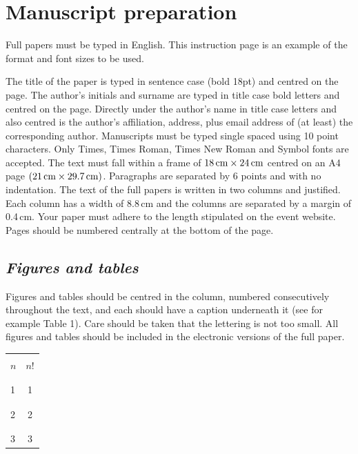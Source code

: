 \documentclass[12pt]{IET02}
\begin{document}

\section{Manuscript preparation}

Full papers must be typed in English. This instruction page is an
example of the format and font sizes to be used.

The title of the paper is typed in sentence case (bold 18pt) and
centred on the page. The author's initials and surname are typed
in title case bold letters and centred on the page. Directly under
the author's name in title case letters and also centred is the
author's affiliation, address, plus email address of (at least)
the corresponding author. Manuscripts must be typed single spaced
using 10 point characters. Only Times, Times Roman, Times New
Roman and Symbol fonts are accepted. The text must fall within a
frame of $18\,\hbox{cm} \times 24\,\hbox{cm}$ centred on an A4
page $(21\,\hbox{cm} \times 29.7\,\hbox{cm})$. Paragraphs are
separated by 6 points and with no indentation. The text of the
full papers is written in two columns and justified. Each column
has a width of 8.8\,cm and the columns are separated by a margin
of 0.4\,cm. Your paper must adhere to the length stipulated on the
event website. Pages should be numbered centrally at the bottom of
the page.

\subsection{\it Figures and tables}

Figures and tables should be centred in the column, numbered
consecutively throughout the text, and each should have a caption
underneath it (see for example Table 1). Care should be taken that
the lettering is not too small. All figures and tables should be
included in the electronic versions of the full paper.

\begin{table}[h]%
{\begin{tabular}{@{}|@{\ \ \qquad}l@{\ \ \qquad}|@{\ \ \qquad}c@{\ \ \qquad}|@{}}\hline
 &\\[-.6pc]
$n$ &$n$! \\[-.6pc]
 &\\\hline
 &\\[-.6pc]
1 &1\\[-.6pc]
 &\\\hline
 &\\[-.6pc]
2 &2\\[-.6pc]
 &\\\hline
 &\\[-.6pc]
3 &3\\[.2pc]\hline
\end{tabular}}{}
\end{table}
\end{document}
